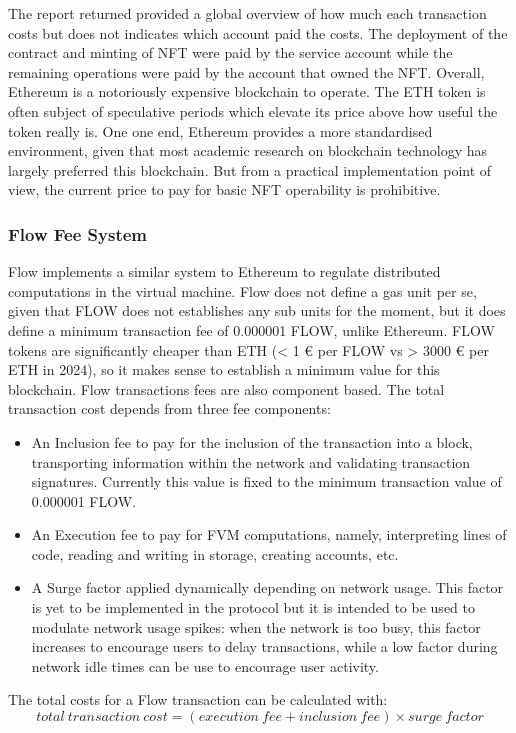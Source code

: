 \documentclass[../main.tex]{subfiles}
\begin{document}
The report returned provided a global overview of how much each transaction costs but does not indicates which account paid the costs. The deployment of the contract and minting of NFT were paid by the service account while the remaining operations were paid by the account that owned the NFT. Overall, Ethereum is a notoriously expensive blockchain to operate. The ETH token is often subject of speculative periods which elevate its price above how useful the token really is. One one end, Ethereum provides a more standardised environment, given that most academic research on blockchain technology has largely preferred this blockchain. But from a practical implementation point of view, the current price to pay for basic NFT operability is prohibitive.

\subsubsection{Flow Fee System}
Flow implements a similar system to Ethereum to regulate distributed computations in the virtual machine. Flow does not define a gas unit per se, given that FLOW does not establishes any sub units for the moment, but it does define a minimum transaction fee of 0.000001 FLOW, unlike Ethereum. FLOW tokens are significantly cheaper than ETH (< 1 € per FLOW vs > 3000 € per ETH in 2024), so it makes sense to establish a minimum value for this blockchain. Flow transactions fees are also component based. The total transaction cost depends from three fee components:
\begin {itemize}
\item {An Inclusion fee} to pay for the inclusion of the transaction into a block, transporting information within the network and validating transaction signatures. Currently this value is fixed to the minimum transaction value of 0.000001 FLOW.
\item {An Execution fee} to pay for FVM computations, namely, interpreting lines of code, reading and writing in storage, creating accounts, etc.
\item {A Surge factor} applied dynamically depending on network usage. This factor is yet to be implemented in the protocol but it is intended to be used to modulate network usage spikes: when the network is too busy, this factor increases to encourage users to delay transactions, while a low factor during network idle times can be use to encourage user activity.
\end{itemize}

The total costs for a Flow transaction can be calculated with:
$$
    total\: transaction\: cost = (execution\: fee + inclusion\: fee) \times surge\: factor
$$
\end{document}
